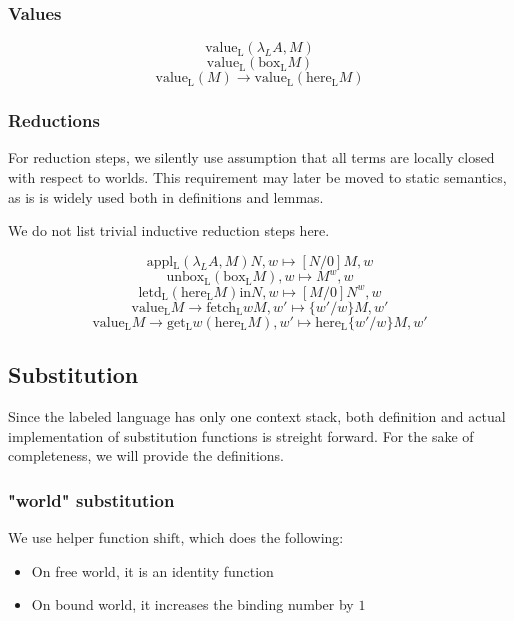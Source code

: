 \documentclass[12pt]{article}
\begin{document}
\subsubsection{Values}
$$\mathrm{value_L}(\lambda_L A, M)$$
$$\mathrm{value_L}(\mathrm{box_L} M)$$
$$\mathrm{value_L}(M) \rightarrow \mathrm{value_L}(\mathrm{here_L} M)$$

\subsubsection{Reductions}
For reduction steps, we silently use assumption that all terms are locally closed with respect to worlds.
This requirement may later be moved to static semantics, as is is widely used both in definitions and lemmas.

We do not list trivial inductive reduction steps here.

$$ \mathrm{appl_L} (\lambda_L A, M) N, w  \mapsto [ N / 0 ] M, w $$
$$ \mathrm{unbox_L} (\mathrm{box_L} M ), w \mapsto M^w, w $$
$$ \mathrm{letd_L} (\mathrm{here_L} M) \mathrm{in} N, w \mapsto [ M / 0 ] N^w, w $$
$$ \mathrm{value_L} M \rightarrow \mathrm{fetch_L} w M, w' \mapsto \{ w' / w \} M, w' $$
$$ \mathrm{value_L} M \rightarrow 
		\mathrm{get_L} w (\mathrm{here_L} M) , w' \mapsto 
		\mathrm{here_L} \{ w' / w \} M, w' $$

\subsection{Substitution}
Since the labeled language has only one context stack, both definition and actual implementation of substitution functions is streight forward. For the sake of completeness, we will provide the definitions.

\subsubsection{"world" substitution}
We use helper function $\mathrm{shift}$, which does the following:
\begin{itemize}
	\item On free world, it is an identity function
	\item On bound world, it increases the binding number by $1$
\end{itemize}
\end{document}
